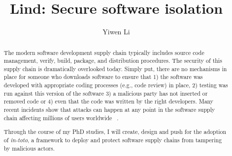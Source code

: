 \documentclass[letterpaper, onecolumn, 10pt]{article}
\author{Yiwen Li}
\begin{document}
\date{}

\title{\Large \bf Lind: Secure software isolation}

\maketitle

\begin{abstract}

The modern software development supply chain typically includes source code
    management, verify, build, package, and distribution procedures. %
    The security of this supply chain is dramatically overlooked
    today. Simply put, there are no mechanisms in place for someone who
    downloads software to ensure that 1) the software was developed with
    appropriate coding processes (e.g., code review) in place, 2) testing was
    run against this version of the software 3) a malicious party has not
    inserted or removed code or 4) even that the code was written by the right
    developers. Many recent incidents show that attacks can happen at any point
    in the software supply chain affecting millions of users worldwide
    ~\cite{aurora-scm, linux-backdoor-2003, homakov-hack-again, cloud-spaces,
    linux, redhat-hacked, adobe-hack, proftpd-hack, github-hacked-millions}.

Through the course of my PhD studies, I will create, design and push for the
    adoption of \emph{in-toto}, a framework to deploy and protect software
    supply chains from tampering by malicious actors.

\end{abstract}







\end{document}
